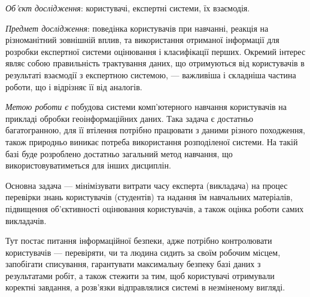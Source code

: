 


\textit{Об’єкт дослідження}:
користувачі, експертні системи, їх взаємодія.

\textit{Предмет дослідження}:
поведінка користувачів при навчанні, реакція на різноманітний зовнішній вплив,
та використання отриманої інформації для розробки експертної системи оцінювання
і класифікації перших.
Окремий інтерес являє собою правильність трактування даних, що отримуються від
користувачів в результаті взаємодії з експертною системою, --- важливіша і
складніша частина роботи, що і відрізняє її від аналогів.

\textit{Метою роботи є}
побудова системи комп’ютерного навчання користувачів на прикладі обробки
геоінформаційних даних.
Така задача є достатньо багатогранною, для її втілення потрібно працювати
з даними різного походження, також природньо виникає потреба використання
розподіленої системи.
На такій базі буде розроблено достатньо загальний метод навчання,
що використовуватиметься для інших дисциплін.

Основна задача --- мінімізувати витрати часу експерта (викладача) на процес
перевірки знань користувачів (студентів) та надання їм навчальних матеріалів,
підвищення об’єктивності оцінювання користувачів, а також оцінка роботи
самих викладачів.

Тут постає питання інформаційної безпеки, адже потрібно контролювати
користувачів --- перевіряти, чи та людина сидить за своїм робочим місцем,
запобігати списування, гарантувати максимальну безпеку базі даних з
результатами робіт, а також стежити за тим, щоб користувачі отримували коректні
завдання, а розв’язки відправлялися системі в незміненому вигляді.
